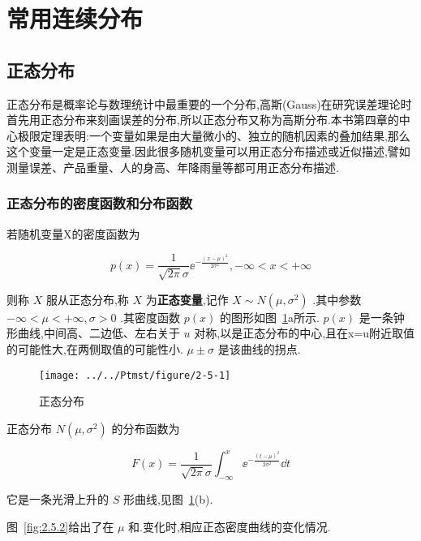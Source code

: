 \section{常用连续分布}\label{sec:2.5}

\subsection{正态分布}\label{ssec:2.5.1}

正态分布是概率论与数理统计中最重要的一个分布,高斯(Gauss)在研究误差理论时首先用正态分布来刻画误差的分布,所以正态分布又称为高斯分布.本书第四章的中心极限定理表明:一个变量如果是由大量微小的、独立的随机因素的叠加结果,那么这个变量一定是正态变量.因此很多随机变量可以用正态分布描述或近似描述,譬如测量误差、产品重量、人的身高、年降雨量等都可用正态分布描述.

\subsubsection{正态分布的密度函数和分布函数}

若随机变量X的密度函数为

\begin{equation}
p(x)=\frac{1}{\sqrt{2 \pi} \sigma} \ee ^{-\frac{(x-\mu)^{2}}{2 \sigma^{2}}},-\infty<x<+\infty \label{eq:2.5.1}
\end{equation}

则称 $ X $ 服从正态分布,称 $ X $ 为\textbf{正态变量},记作 $ X \sim N\left(\mu, \sigma^{2}\right) $ .其中参数 $ -\infty< \mu<+\infty, \sigma>0 $ .其密度函数 $ p(x) $ 的图形如图~\ref{fig:2.5.1}a所示. $ p(x) $ 是一条钟形曲线,中间高、二边低、左右关于 $ u $ 对称,以是正态分布的中心,且在x=u附近取值的可能性大,在两侧取值的可能性小. $ \mu \pm \sigma $ 是该曲线的拐点.

\begin{figure}
	\centering
	\texttt{[image: ../../Ptmst/figure/2-5-1]}
	\caption{正态分布}
	\label{fig:2.5.1}
\end{figure}

正态分布 $ N\left(\mu, \sigma^{2}\right) $ 的分布函数为

\begin{equation}
F(x)=\frac{1}{\sqrt{2 \pi} \sigma} \int_{-\infty}^{x} \ee ^{-\frac{(t-\mu)^{2}}{2 \sigma^{2}}} \dd t \label{eq:2.5.2}
\end{equation}

它是一条光滑上升的 $ S $ 形曲线,见图~\ref{fig:2.5.1}(b).

图~\ref{fig:2.5.2}给出了在 $ \mu $ 和.变化时,相应正态密度曲线的变化情况.

